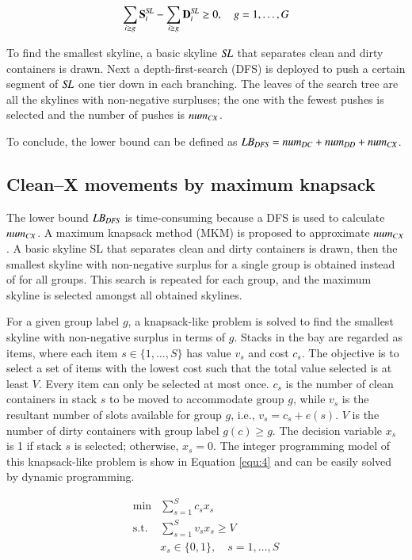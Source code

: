 \documentclass[review,3p,times,authoryear,12pt]{elsarticle}
\begin{document}
\begin{equation}
\label{equ:3}
\sum\limits_{i\ge g}\mathbf S^\id{SL}_i-\sum\limits_{i\ge g}\mathbf D^\id{SL}_i\ge0, \quad g=1,\dots,G
\end{equation}

To find the smallest skyline, a basic skyline $\id{SL}$ that separates clean and dirty containers is drawn. Next a depth-first-search (DFS) is deployed to push a certain segment of $\id{SL}$ one tier down in each branching. The leaves of the search tree are all the skylines with non-negative surpluses; the one with the fewest pushes is selected and the number of pushes is $\id{num}_\id{CX}$.

To conclude, the lower bound can be defined as $\id{LB}_\id{DFS}=\id{num}_\id{DC}+\id{num}_\id{DD}+\id{num}_\id{CX}$.

\subsection{Clean--X movements by maximum knapsack}

The lower bound $\id{LB}_\id{DFS}$ is time-consuming because a DFS is used to calculate $\id{num}_{\id{CX}}$. A maximum knapsack method (MKM) is proposed to approximate $\id{num}_{CX}$. A basic skyline SL that separates clean and dirty containers is drawn, then the smallest skyline with non-negative surplus for a single group is obtained instead of for all groups. This search is repeated for each group, and the maximum skyline is selected amongst all obtained skylines.

For a given group label $g$, a knapsack-like problem is solved to find the smallest skyline with non-negative surplus in terms of $g$. Stacks in the bay are regarded as items, where each item $s\in\{1,\dots,S\}$ has value $v_s$ and cost $c_s$. The objective is to select a set of items with the lowest cost such that the total value selected is at least $V$. Every item can only be selected at most once. $c_s$ is the number of clean containers in stack $s$ to be moved to accommodate group $g$, while $v_s$ is the resultant number of slots available for group $g$, i.e., $v_s=c_s+e(s)$. $V$ is the number of dirty containers with group label $g(c)\ge g$. The decision variable $x_s$ is 1 if stack $s$ is selected; otherwise, $x_s=0$. The integer programming model of this knapsack-like problem is show in Equation \ref{equ:4} and can be easily solved by dynamic programming.


\begin{equation}
\label{equ:4}
\begin{array}{rl}
\min & \sum\limits_{s=1}^S c_s x_s\\
\mathrm{s.t.} &\sum\limits_{s=1}^S v_s x_s\ge V\\
&x_s\in\{0,1\}, \quad s=1,\dots,S
\end{array}
\end{equation}
\end{document}
